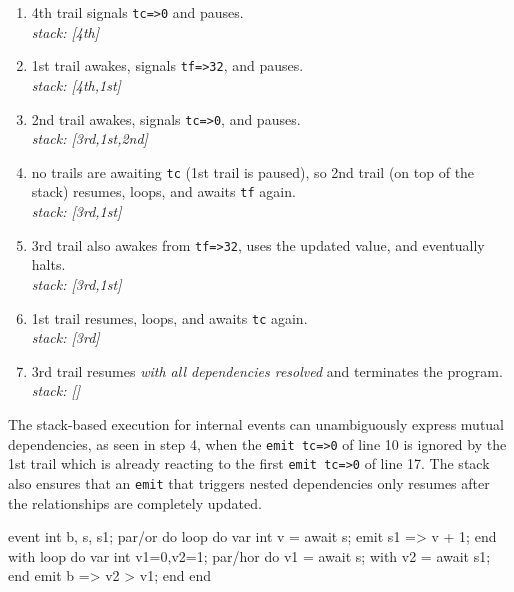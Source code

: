 \documentclass{acm_proc_article-sp}
\newcommand{\code}[1] {{\small{\texttt{#1}}}}
\newcommand{\1}{\;}
\newcommand{\2}{\;\;}
\newcommand{\3}{\;\;\;}
\newcommand{\5}{\;\;\;\;\;}
\begin{document}
{\small
\begin{enumerate}
\setlength{\itemsep}{0pt}
\item 4th trail signals \code{tc=>0} and pauses.\\
    \emph{stack: [4th]}
\item 1st trail awakes, signals \code{tf=>32}, and pauses.\\
    \emph{stack: [4th,1st]}
\item 2nd trail awakes, signals \code{tc=>0}, and pauses.\\
    \emph{stack: [3rd,1st,2nd]}
\item no trails are awaiting \code{tc} (1st trail is paused), so 2nd trail (on 
    top of the stack) resumes, loops, and awaits \code{tf} again.\\
    \emph{stack: [3rd,1st]}
\item 3rd trail also awakes from \code{tf=>32}, uses the updated value, and 
    eventually halts.\\
    \emph{stack: [3rd,1st]}
\item 1st trail resumes, loops, and awaits \code{tc} again.\\
    \emph{stack: [3rd]}
\item 3rd trail resumes \emph{with all dependencies resolved} and terminates 
    the program.\\
    \emph{stack: []}
\end{enumerate}
}

The stack-based execution for internal events can unambiguously express mutual 
dependencies, as seen in step 4, when the \code{emit tc=>0} of line 10 is 
ignored by the 1st trail which is already reacting to the first
\code{emit tc=>0} of line 17.
%
The stack also ensures that an \code{emit} that triggers nested dependencies 
only resumes after the relationships are completely updated.

event int b, s, s1;
par/or do
    loop do
        var int v = await s;
        emit s1 => v + 1;
    end
with
    loop do
        var int v1=0,v2=1;
        par/hor do
            v1 = await s;
        with
            v2 = await s1;
        end
        emit b => v2 > v1;
    end
end
\end{document}
